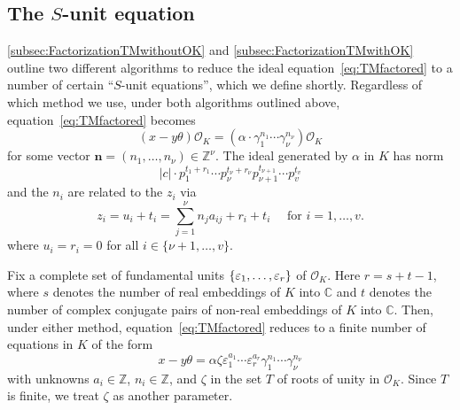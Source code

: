 
\subsection{The $S$-unit equation}
\label{subsec:SUnitEquation}

\autoref{subsec:FactorizationTMwithoutOK} and  \autoref{subsec:FactorizationTMwithOK} outline two different algorithms to reduce the ideal equation~\eqref{eq:TMfactored} to a number of certain ``$S$-unit equations'', which we define shortly. Regardless of which method we use, under both algorithms outlined above, equation~\eqref{eq:TMfactored} becomes
\begin{equation} \label{eq:TMprincipal}
(x-y\theta) \mathcal{O}_K= (\alpha \cdot \gamma_1^{n_1} \cdots \gamma_{\nu}^{n_{\nu}}) \mathcal{O}_K
\end{equation}
for some vector $\mathbf{n} = (n_1, \dots, n_{\nu}) \in \mathbb{Z}^{\nu}$. The ideal generated by $\alpha$ in $K$ has norm 
\[|c|\cdot p_1^{t_1 + r_1} \cdots p_{\nu}^{t_{\nu} + r_{\nu}}p_{\nu +1}^{t_{\nu +1}} \cdots p_v^{t_v}\]
and the $n_i$ are related to the $z_i$ via
\[z_i = u_i + t_i = \sum_{j = 1}^{\nu}n_ja_{ij} + r_i + t_i \quad \text{ for } i =1, \dots, v.\]
where $u_i = r_i = 0$ for all $i \in \{\nu + 1, \dots, v\}$. 

Fix a complete set of fundamental units $\{\varepsilon_1, \dots, \varepsilon_r\}$ of $\mathcal{O}_K$. Here $r = s + t -1$, where $s$ denotes the number of real embeddings of $K$ into $\mathbb{C}$ and $t$ denotes the number of complex conjugate pairs of non-real embeddings of $K$ into $\mathbb{C}$. Then, under either method, equation~\eqref{eq:TMfactored} reduces to a finite number of equations in $K$ of the form
\begin{equation} \label{eq:TMinK}
x-y\theta = \alpha \zeta \varepsilon_1^{a_1} \cdots \varepsilon_r^{a_r}\gamma_1^{n_1}\cdots \gamma_{\nu}^{n_{\nu}}
\end{equation}
with unknowns $a_i \in \mathbb{Z}$, $n_i \in \mathbb{Z}$, and $\zeta$ in the set $T$ of roots of unity in $\mathcal{O}_K$. Since $T$ is finite, we treat $\zeta$ as another parameter. 

